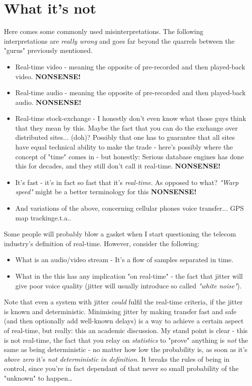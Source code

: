 \chapter{What it's not}
Here comes some commonly used misinterpretations. The following interpretations are \textit{really wrong} and goes far beyond the quarrels between the "gurus" previously mentioned.

\begin{itemize}
\item Real-time video - meaning the opposite of pre-recorded and then played-back video. \textbf{NONSENSE!}
\item  Real-time audio - meaning the opposite of pre-recorded and then played-back audio. \textbf{NONSENSE!}
\item  Real-time stock-exchange - I honestly don't even know what those guys think that they mean by this. Maybe the fact that you can do the exchange over distributed sites... (doh)? Possibly that one has to guarantee that all sites have equal technical ability to make the trade - here's possibly where the concept of "time" comes in - but honestly: Serious database engines has done this for decades, and they still don't call it real-time. \textbf{NONSENSE!}
\item  It's fast - it's in fact so fast that it's \textit{real-time}. As opposed to what? \textit{"Warp speed"} might be a better terminology for this \textbf{NONSENSE!}
\item  And variations of the above, concerning cellular phones voice transfer... GPS map trackinge.t.a..
\end{itemize}
Some people will probably blow a gasket when I start questioning the telecom industry's definition of real-time. However, consider the following:

\begin{itemize}
\item  What is an audio/video stream - It's a flow of samples separated in time.
\item  What in the this has any implication "on real-time" - the fact that jitter will give poor voice quality (jitter will usually introduce so called \textit{"white noise"}). 
\end{itemize}
Note that even a system with jitter \textit{could} fulfil the real-time criteria, if the jitter is known and deterministic. Minimising jitter by making transfer fast and safe (and then optionally add well-known delays) is a way to achieve a certain aspect of real-time, but really: this an academic discussion. My stand point is clear - this is not real-time, the fact that you relay on \textit{statistics} to "prove" anything is \textit{not} the same as being deterministic - no matter how low the probability is, as soon as it's \textit{above zero} it's \textit{not deterministic in definition}. It breaks the rules of being in control, since you're in fact dependant of that never so small probability of the "unknown" to happen\ldots


